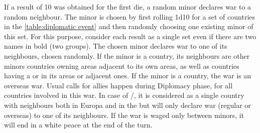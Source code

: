  If a result of 10 was obtained for the
first die, a random minor declares war to a random neighbour.
\bparag The minor is chosen by first rolling 1d10 for a set of
countries in the \ref{table:diplomatic event} and then randomly
choosing one existing minor of this set. For this purpose, consider
each result as a single set even if there are two names in bold (two
groups).
\bparag The chosen minor declares war to one of its neighbours, chosen
randomly.
\bparag If the minor is a \ROTW country, its neighbours are other minors
countries owning areas adjacent to its own areas, as well as countries
having a \TP or \COL in its areas or adjacent ones.
\bparag If the minor is a \ROTW country, the war is an overseas war.
\bparag Usual calls for allies happen during Diplomacy phase, for all
countries involved in this war.
\bparag In case of \paysPerse/\paysOrmus, it is considered as a single
country with neighbours both in Europa and in the \ROTW but will only
declare war (regular or overseas) to one of its neighbours.
\bparag If the war is waged only between minors, it will end in a
white peace at the end of the turn.


